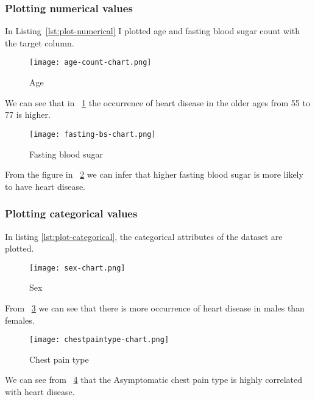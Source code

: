 \subsubsection{Plotting numerical values}
In Listing~\ref{lst:plot-numerical} I plotted age and fasting blood sugar count with the target column.


\begin{figure}[htb]
	\centering
	\texttt{[image: age-count-chart.png]}
	\caption{Age}
	\label{fig:age-count-chart}
\end{figure}
We can see that in \figurename~\ref{fig:age-count-chart} the occurrence of heart disease in the older ages from 55 to 77 is higher.

\begin{figure}[htb]
	\centering
	\texttt{[image: fasting-bs-chart.png]}
	\caption{Fasting blood sugar}
	\label{fig:fasting-bs-chart}
\end{figure}

From the figure in ~\ref{fig:fasting-bs-chart} we can infer that higher fasting blood sugar is more likely to have heart disease.
\subsubsection{Plotting categorical values}
In listing \ref{lst:plot-categorical}, the categorical attributes of the dataset are plotted.

\begin{figure}[htb]
	\centering
	\texttt{[image: sex-chart.png]}
	\caption{Sex}
	\label{fig:sex-chart}
\end{figure}

From \figurename~\ref{fig:sex-chart} we can see that there is more occurrence of heart disease in males than females.

\begin{figure}[htb]
	\centering
	\texttt{[image: chestpaintype-chart.png]}
	\caption{Chest pain type}
	\label{fig:chestpaintype-chart}
\end{figure}
We can see from \figurename~\ref{fig:chestpaintype-chart} that the Asymptomatic chest pain type is highly correlated with heart disease.

